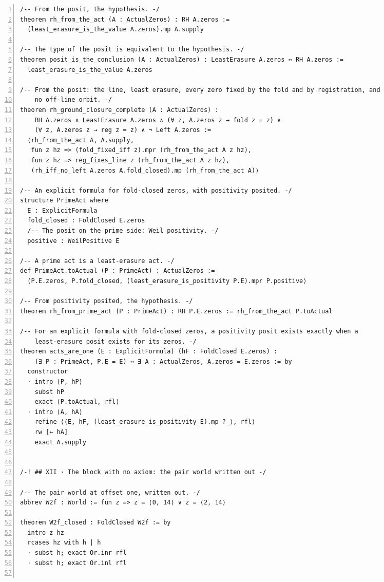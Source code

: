 \documentclass[10pt]{article}
\newcommand{\leansize}{\fontsize{5.5pt}{6.75pt}\selectfont}
\begin{document}
\begin{multicols}{2}
\begin{Verbatim}[numbers=left,firstnumber=1,numbersep=3pt,xleftmargin=2.6em,breaklines=true,breakanywhere=true,breakautoindent=false,breakindent=1.4em,breaksymbolleft={},breakanywheresymbolpre={},fontsize=\leansize]
/-- From the posit, the hypothesis. -/
theorem rh_from_the_act (A : ActualZeros) : RH A.zeros :=
  (least_erasure_is_the_value A.zeros).mp A.supply

/-- The type of the posit is equivalent to the hypothesis. -/
theorem posit_is_the_conclusion (A : ActualZeros) : LeastErasure A.zeros ↔ RH A.zeros :=
  least_erasure_is_the_value A.zeros

/-- From the posit: the line, least erasure, every zero fixed by the fold and by registration, and
    no off-line orbit. -/
theorem rh_ground_closure_complete (A : ActualZeros) :
    RH A.zeros ∧ LeastErasure A.zeros ∧ (∀ z, A.zeros z → fold z = z) ∧
    (∀ z, A.zeros z → reg z = z) ∧ ¬ Left A.zeros :=
  ⟨rh_from_the_act A, A.supply,
   fun z hz => (fold_fixed_iff z).mpr (rh_from_the_act A z hz),
   fun z hz => reg_fixes_line z (rh_from_the_act A z hz),
   (rh_iff_no_left A.zeros A.fold_closed).mp (rh_from_the_act A)⟩

/-- An explicit formula for fold-closed zeros, with positivity posited. -/
structure PrimeAct where
  E : ExplicitFormula
  fold_closed : FoldClosed E.zeros
  /-- The posit on the prime side: Weil positivity. -/
  positive : WeilPositive E

/-- A prime act is a least-erasure act. -/
def PrimeAct.toActual (P : PrimeAct) : ActualZeros :=
  ⟨P.E.zeros, P.fold_closed, (least_erasure_is_positivity P.E).mpr P.positive⟩

/-- From positivity posited, the hypothesis. -/
theorem rh_from_prime_act (P : PrimeAct) : RH P.E.zeros := rh_from_the_act P.toActual

/-- For an explicit formula with fold-closed zeros, a positivity posit exists exactly when a
    least-erasure posit exists for its zeros. -/
theorem acts_are_one (E : ExplicitFormula) (hF : FoldClosed E.zeros) :
    (∃ P : PrimeAct, P.E = E) ↔ ∃ A : ActualZeros, A.zeros = E.zeros := by
  constructor
  · intro ⟨P, hP⟩
    subst hP
    exact ⟨P.toActual, rfl⟩
  · intro ⟨A, hA⟩
    refine ⟨⟨E, hF, (least_erasure_is_positivity E).mp ?_⟩, rfl⟩
    rw [← hA]
    exact A.supply


/-! ## XII · The block with no axiom: the pair world written out -/

/-- The pair world at offset one, written out. -/
abbrev W2f : World := fun z => z = ⟨0, 14⟩ ∨ z = ⟨2, 14⟩

theorem W2f_closed : FoldClosed W2f := by
  intro z hz
  rcases hz with h | h
  · subst h; exact Or.inr rfl
  · subst h; exact Or.inl rfl


\end{Verbatim}
\end{multicols}
\end{document}
